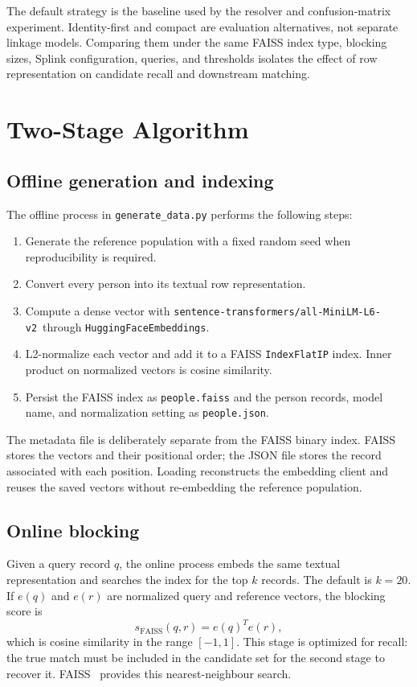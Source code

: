 \documentclass[conference]{IEEEtran}
\begin{document}
The default strategy is the baseline used by the resolver and confusion-matrix experiment. Identity-first and compact are evaluation alternatives, not separate linkage models. Comparing them under the same FAISS index type, blocking sizes, Splink configuration, queries, and thresholds isolates the effect of row representation on candidate recall and downstream matching.

\section{Two-Stage Algorithm}
\subsection{Offline generation and indexing}
The offline process in \texttt{generate\_data.py} performs the following steps:
\begin{enumerate}[leftmargin=*]
  \item Generate the reference population with a fixed random seed when reproducibility is required.
  \item Convert every person into its textual row representation.
  \item Compute a dense vector with {\footnotesize\texttt{sentence-transformers/all-MiniLM-L6-v2}\allowbreak\ through \texttt{HuggingFaceEmbeddings}\kern-0.4pt}.
  \item L2-normalize each vector and add it to a FAISS \texttt{IndexFlatIP} index. Inner product on normalized vectors is cosine similarity.
  \item Persist the FAISS index as \texttt{people.faiss} and the person records, model name, and normalization setting as \texttt{people.json}.
\end{enumerate}

The metadata file is deliberately separate from the FAISS binary index. FAISS stores the vectors and their positional order; the JSON file stores the record associated with each position. Loading reconstructs the embedding client and reuses the saved vectors without re-embedding the reference population.

\subsection{Online blocking}
Given a query record $q$, the online process embeds the same textual representation and searches the index for the top $k$ records. The default is $k=20$. If $e(q)$ and $e(r)$ are normalized query and reference vectors, the blocking score is
\[
 s_{\mathrm{FAISS}}(q,r) = e(q)^T e(r),
\]
which is cosine similarity in the range $[-1,1]$. This stage is optimized for recall: the true match must be included in the candidate set for the second stage to recover it. FAISS~\cite{johnson2019} provides this nearest-neighbour search.
\end{document}
